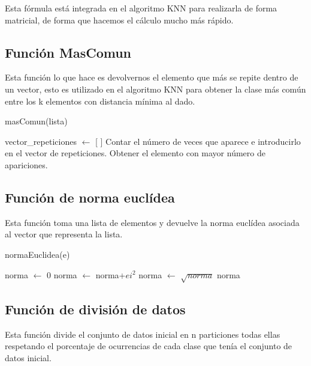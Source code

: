 \documentclass[12pt,a4paper]{article}
\begin{document}
	Esta fórmula está integrada en el algoritmo KNN para realizarla de forma matricial, de forma que hacemos el cálculo mucho más rápido.
	
	\subsection{Función MasComun}
	
	Esta función lo que hace es devolvernos el elemento que más se repite dentro de un vector, esto es utilizado en el algoritmo KNN para obtener la clase más común entre los k elementos con distancia mínima al dado.
	
	\begin{algorithm}[!h]
		\caption{masComun(lista)}
		\begin{algorithmic}
			\STATE vector\_repeticiones $\leftarrow$ [ ]
			\STATE Contar el número de veces que aparece e introducirlo en el vector de repeticiones.
			\ENDFOR
			\STATE Obtener el elemento con mayor número de apariciones.
		\end{algorithmic}
	\end{algorithm}
	
	\subsection{Función de norma euclídea}
	
	Esta función toma una lista de elementos y devuelve la norma euclídea asociada al vector que representa la lista.
	
	\begin{algorithm}[!h]
		\caption{normaEuclidea(e)}
		\begin{algorithmic}
			\STATE norma $\leftarrow$ 0
			\FOR{ei en e}
			\STATE norma $\leftarrow$ norma+$ei^2$
			\ENDFOR
			\STATE norma $\leftarrow$ $\sqrt{norma}$
			\RETURN norma
		\end{algorithmic}
	\end{algorithm}
	
	\subsection{Función de división de datos}
	
	Esta función divide el conjunto de datos inicial en n particiones todas ellas respetando el porcentaje de ocurrencias de cada clase que tenía el conjunto de datos inicial.
	
\end{document}
